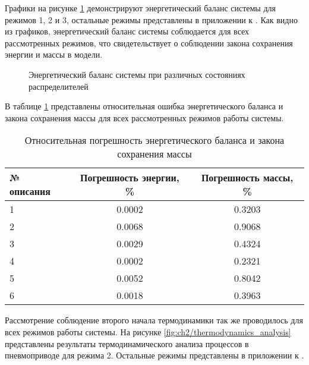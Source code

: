 Графики на рисунке \ref{fig:ch2/energy_balance} демонстрируют энергетический баланс системы для режимов 1, 2 и 3, остальные
режимы представлены в приложении к . Как видно из графиков, энергетический баланс системы соблюдается
для всех рассмотренных режимов, что свидетельствует о соблюдении закона сохранения энергии и массы в модели.

\begin{figure}[ht]
    \caption{Энергетический баланс системы при различных состояниях распределителей}
    \label{fig:ch2/energy_balance}

\end{figure}

В таблице \ref{tab:ch2/energy_balance} представлены относительная ошибка
энергетического баланса и закона сохранения массы
для всех рассмотренных режимов работы системы.

\begin{table}[h]
    \centering
    \caption{Относительная погрешность энергетического баланса и закона сохранения массы}
    \begin{tabular}{l|c|c}
        \midrule
        № описания & Погрешность энергии, \% & Погрешность массы, \% \\
        \midrule
        1          & \num{0.0002}                  & \num{0.3203}                \\
        \hline
        2          & \num{0.0068}                  & \num{0.9068}                \\
        \hline
        3          & \num{0.0029}                  & \num{0.4324}                \\
        \hline
        4          & \num{0.0002}                  & \num{0.2321}                \\
        \hline
        5          & \num{0.0052}                  & \num{0.8042}                \\
        \hline
        6          & \num{0.0018}                  & \num{0.3963}                \\
        \midrule
    \end{tabular}
    \label{tab:ch2/energy_balance}
\end{table}

Рассмотрение соблюдение второго начала термодинамики так же проводилось для всех режимов работы системы. На рисунке
\ref{fig:ch2/thermodynamics_analysis} представлены результаты термодинамического анализа процессов в пневмоприводе 
для режима 2. Остальные режимы представлены в приложении к .

